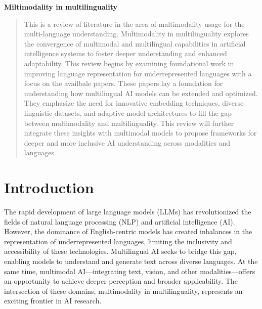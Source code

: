 \documentclass[12pt,a4]{article}
\begin{document}
% 

\begin{center}
\Large \bf Miltimodality in multilinguality
\end{center}

  \begin{@twocolumnfalse}
    \begin{abstract}
        This is a review of literature in the area of maltimodality usage for the multi-language understanding.
        Multimodality in multilinguality explores the convergence of multimodal and multilingual capabilities 
        in artificial intelligence systems to foster deeper understanding and enhanced adaptability. 
        This review begins by examining foundational work in improving language representation 
        for underrepresented languages with a focus on the availbale papers.
        These papers lay a foundation for understanding how multilingual AI models can be extended 
        and optimized. They emphasize the need for innovative embedding techniques, diverse linguistic datasets, 
        and adaptive model architectures to fill the gap between multimodality and multilinguality. 
        This review will further integrate these insights with multimodal models to propose frameworks 
        for deeper and more inclusive AI understanding across modalities and languages.
    \end{abstract}
  \end{@twocolumnfalse}

  \section{Introduction}
    \label{submission}
    The rapid development of large language models (LLMs) has revolutionized the fields of natural language processing 
    (NLP) and artificial intelligence (AI). However, the dominance of English-centric models has created inbalances 
    in the representation of underrepresented languages, limiting the inclusivity and accessibility 
    of these technologies. Multilingual AI seeks to bridge this gap, enabling models to understand 
    and generate text across diverse languages. At the same time, multimodal AI—integrating text, 
    vision, and other modalities—offers an opportunity to achieve deeper perception and broader applicability. 
    The intersection of these domains, multimodality in multilinguality, represents an exciting frontier in AI research.
\end{document}
